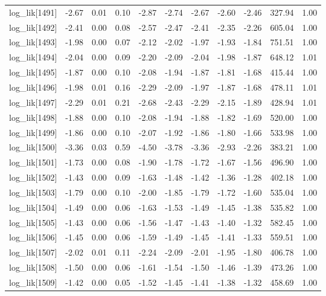 \begin{table}[ht]
\begin{tabular}{rrrrrrrrrrr}
  log\_lik[1491] & -2.67 & 0.01 & 0.10 & -2.87 & -2.74 & -2.67 & -2.60 & -2.46 & 327.94 & 1.00 \\ 
  log\_lik[1492] & -2.41 & 0.00 & 0.08 & -2.57 & -2.47 & -2.41 & -2.35 & -2.26 & 605.04 & 1.00 \\ 
  log\_lik[1493] & -1.98 & 0.00 & 0.07 & -2.12 & -2.02 & -1.97 & -1.93 & -1.84 & 751.51 & 1.00 \\ 
  log\_lik[1494] & -2.04 & 0.00 & 0.09 & -2.20 & -2.09 & -2.04 & -1.98 & -1.87 & 648.12 & 1.01 \\ 
  log\_lik[1495] & -1.87 & 0.00 & 0.10 & -2.08 & -1.94 & -1.87 & -1.81 & -1.68 & 415.44 & 1.00 \\ 
  log\_lik[1496] & -1.98 & 0.01 & 0.16 & -2.29 & -2.09 & -1.97 & -1.87 & -1.68 & 478.11 & 1.01 \\ 
  log\_lik[1497] & -2.29 & 0.01 & 0.21 & -2.68 & -2.43 & -2.29 & -2.15 & -1.89 & 428.94 & 1.01 \\ 
  log\_lik[1498] & -1.88 & 0.00 & 0.10 & -2.08 & -1.94 & -1.88 & -1.82 & -1.69 & 520.00 & 1.00 \\ 
  log\_lik[1499] & -1.86 & 0.00 & 0.10 & -2.07 & -1.92 & -1.86 & -1.80 & -1.66 & 533.98 & 1.00 \\ 
  log\_lik[1500] & -3.36 & 0.03 & 0.59 & -4.50 & -3.78 & -3.36 & -2.93 & -2.26 & 383.21 & 1.00 \\ 
  log\_lik[1501] & -1.73 & 0.00 & 0.08 & -1.90 & -1.78 & -1.72 & -1.67 & -1.56 & 496.90 & 1.00 \\ 
  log\_lik[1502] & -1.43 & 0.00 & 0.09 & -1.63 & -1.48 & -1.42 & -1.36 & -1.28 & 402.18 & 1.00 \\ 
  log\_lik[1503] & -1.79 & 0.00 & 0.10 & -2.00 & -1.85 & -1.79 & -1.72 & -1.60 & 535.04 & 1.00 \\ 
  log\_lik[1504] & -1.49 & 0.00 & 0.06 & -1.63 & -1.53 & -1.49 & -1.45 & -1.38 & 535.82 & 1.00 \\ 
  log\_lik[1505] & -1.43 & 0.00 & 0.06 & -1.56 & -1.47 & -1.43 & -1.40 & -1.32 & 582.45 & 1.00 \\ 
  log\_lik[1506] & -1.45 & 0.00 & 0.06 & -1.59 & -1.49 & -1.45 & -1.41 & -1.33 & 559.51 & 1.00 \\ 
  log\_lik[1507] & -2.02 & 0.01 & 0.11 & -2.24 & -2.09 & -2.01 & -1.95 & -1.80 & 406.78 & 1.00 \\ 
  log\_lik[1508] & -1.50 & 0.00 & 0.06 & -1.61 & -1.54 & -1.50 & -1.46 & -1.39 & 473.26 & 1.00 \\ 
  log\_lik[1509] & -1.42 & 0.00 & 0.05 & -1.52 & -1.45 & -1.41 & -1.38 & -1.32 & 458.69 & 1.00 \\ 

\end{tabular}
\end{table}
